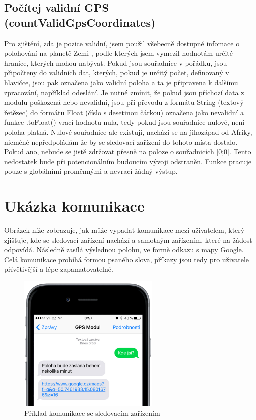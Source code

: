 \documentclass[FM,MP]{tulthesis}  %
\begin{document}
\subsection{Počítej validní GPS (countValidGpsCoordinates)}
Pro zjištění, zda je pozice validní, jsem použil všebecně dostupné infomace o polohování na planetě Zemi \cite{geographic}, podle kterých jsem vymezil hodnotám určité hranice, kterých mohou nabývat. Pokud jsou souřadnice v pořádku, jsou připočteny do validních dat, kterých, pokud je určitý počet, definovaný v hlavičce, jsou pak označena jako validní poloha a ta je připravena k dalšímu zpracování, například odeslání. Je nutné zmínit, že pokud jsou příchozí data z modulu poškozená nebo nevalidní, jsou při převodu z formátu String (textový řetězec) do formátu Float (číslo s desetinou čárkou) označena jako nevalidní a funkce .toFloat() vrací hodnotu nula, tedy pokud jsou souřadnice nulové, není poloha platná. Nulové souřadnice ale existují, nachází se na jihozápad od Afriky, nicméně nepředpoládám že by se sledovací zařízení do tohoto místa dostalo. Pokud ano, nebude se jistě zdržovat přesně na poloze o souřadnicích [0;0]. Tento nedostatek bude při potencionálním budoucím vývoji odstraněn. Funkce pracuje pouze s globálními proměnnými a nevrací žádný výstup.

\section{Ukázka komunikace}
Obrázek níže zobrazuje, jak může vypadat komunikace mezi uživatelem, který zjišťuje, kde se sledovací zařízení nachází a samotným zařízením, které na žádost odpovídá. Následně zasílá výslednou polohu, ve formě odkazu s mapy Google. Celá komunikace probíhá formou psaného slova, příkazy jsou tedy pro uživatele přívětivější a lépe zapamatovatelné.

\begin{figure}[H]
\begin{center}
\includegraphics[width=0.6\textwidth]{images/comm.png}
\caption{Příklad komunikace se sledovacím zařízením}
\label{image}
\end{center}
\end{figure}
\end{document}
